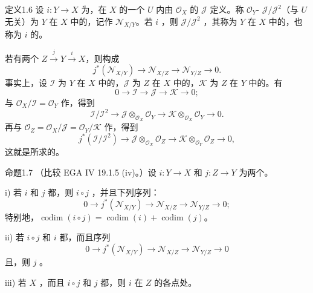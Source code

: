 \begin{SGAresult}{定义}{1.6}
设 $i:Y\to X$ 为，在 $X$ 的一个 $U$ 内由 $\mathcal O_X$ 的 $\mathcal J$ 定义。称 $\mathcal O_Y$- $\mathcal J/\mathcal J^2$（与 $U$ 无关）为 $Y$ 在 $X$ 中的，记作 $\mathcal N_{X/Y}$。若 $i$ ，则 $\mathcal J/\mathcal J^2$ ，其称为 $Y$ 在 $X$ 中的，也称为 $i$ 的。
\end{SGAresult}
若有两个 $Z\xrightarrow{j}Y\xrightarrow{i}X$，则构成
\[
j^*(\mathcal N_{X/Y})\longrightarrow\mathcal N_{X/Z}\longrightarrow\mathcal N_{Y/Z}\longrightarrow0.\tag{1.6.1}
\]
事实上，设 $\mathcal I$ 为 $Y$ 在 $X$ 中的，$\mathcal J$ 为 $Z$ 在 $X$ 中的，$\mathcal K$ 为 $Z$ 在 $Y$ 中的。有
\[
0\longrightarrow\mathcal I\longrightarrow\mathcal J\longrightarrow\mathcal K\longrightarrow0;
\]
与 $\mathcal O_X/\mathcal I=\mathcal O_Y$ 作，得到
\[
\mathcal I/\mathcal I^2\longrightarrow\mathcal J\otimes_{\mathcal O_X}\mathcal O_Y\longrightarrow\mathcal K\otimes_{\mathcal O_X}\mathcal O_Y\longrightarrow0.
\]
再与 $\mathcal O_Z=\mathcal O_X/\mathcal J=\mathcal O_Y/\mathcal K$ 作，得到
\[
j^*(\mathcal I/\mathcal I^2)\longrightarrow\mathcal J\otimes_{\mathcal O_X}\mathcal O_Z\longrightarrow\mathcal K\otimes_{\mathcal O_Y}\mathcal O_Z\longrightarrow0,
\]
这就是所求的。
\begin{SGAresult}{命题}{1.7}
（比较 EGA IV 19.1.5 (iv)。）设 $i:Y\to X$ 和 $j:Z\to Y$ 为两个。

 i) 若 $i$ 和 $j$ 都，则 $i\circ j$ ，并且下列序列：
\[
0\longrightarrow j^*(\mathcal N_{X/Y})\longrightarrow\mathcal N_{X/Z}\longrightarrow\mathcal N_{Y/Z}\longrightarrow0;
\]
特别地，$\operatorname{codim}(i\circ j)=\operatorname{codim}(i)+\operatorname{codim}(j)$。

 ii) 若 $i\circ j$ 和 $i$ 都，而且序列
\[
0\longrightarrow j^*(\mathcal N_{X/Y})\longrightarrow\mathcal N_{X/Z}\longrightarrow\mathcal N_{Y/Z}\longrightarrow0
\]
且，则 $j$ 。

 iii) 若 $X$ ，而且 $i\circ j$ 和 $j$ 都，则 $i$ 在 $Z$ 的各点处。
\end{SGAresult}
